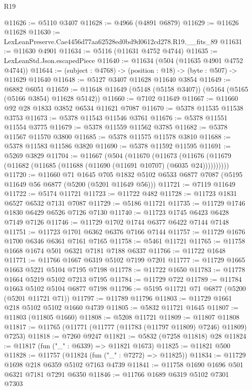\begin{lexlean}{R19}
\begin{coremodule}
{{{{{{{{{{{@11626 := @5110 @3407
@11628 := @4966 (@4891 @6879)
@11629 := @11626 @11628
@11630 := LexLeanPreserve.Cae4456d77aa62528ed0bd9d0612cd278.R19.__fits_89
@11631 := @11630 @4901
@11634 := @5116 (@11631 @4752 @4744)
@11635 := LexLeanStd.Json.escapedPiece
@11640 := @11634 (@504 (@11635 @4901 @4752 @4744))
@11644 := (subject : @4768) -> (position : @18) -> (byte : @507) -> @11629 @11640
@11648 := @5127 @3407 @11628 @11640 @3854
@11649 := @6882 @6051
@11659 := @11648 @11649 (@5148 (@5158 @3407)) (@5164 (@5165 (@5166 @3854) @11628 @5142))
@11660 := @7102 @11649
@11667 := @11660 @92 @28 @1833 @3852 @6534 @11621 @7087
@11670 := @5378 @11535 @11538 @3753
@11673 := @5378 @11543 @11546 @3761
@11676 := @5378 @11551 @11554 @3775
@11679 := @5378 @11559 @11562 @3785
@11682 := @5378 @11567 @11570 @3800
@11685 := @5378 @11575 @11578 @3810
@11688 := @5378 @11583 @11586 @3820
@11690 := @5378 @11592 @11595
@11691 := @5269 @3829
@11704 := @11667
    (@504
      (@11670
        (@11673 (@11676 (@11679 (@11682 (@11685 (@11688 (@11690 (@11691 @10707) (@6035 @24))))))))))
@11720 := @11660
    @71
    @1645
    @705
    @1832
    @5102
    @6533
    @6877
    @7087
    (@5195 @11649 @56 @6877 (@5200 (@5201 @11649 @56)))
@11721 := @7119 @11649
@11722 := @5174 @11721
@11723 := @11722 @482
@11728 := @11723 @1831 @6527 @6532 @7131 @7087
@11729 := @5186 @11721
@11735 := @11729 @1746 @1830 @6429 @6526 @7126 @7130
@11740 := @11723 @1745 @6423 @6428 @7149 @7126
@11746 := @11729 @1702 @1744 @6377 @6422 @7144 @7148
@11751 := @11723 @1701 @6362 @6376 @7166 @7144
@11757 := @11729 @1676 @1700 @6346 @6361 @7161 @7165
@11758 := @5461 @11721
@11765 := @11758 @1668 @1674 @501 @6321 @7181 @7188 @6337
@11766 := @11722 @1648
@11771 := @11766 @1667 @6319 @5102 @7199 @7201
@11777 := @11729 @1665 @1663 @5221 @5104 @7195 @7198
@11778 := @11722 @1650
@11783 := @11778 @1664 @5219 @5102 @7213 @7195
@11784 := @11729 @722
@11789 := @11784 @1663 @5102 @5104 @6877 @7198
@11796 := @5195 @11721 @71 @6877 (@5200 (@5201 @11721 @71))
@11797 := @11789 @11796
@11803 := @11729 @1661 @218 @5102 @5102 @1660 @4739
@11805 := @5832 @11721 @1645
@11807 := @11803 (@11805 @1660)
@11808 := @5208 @11721
@11809 := @11807 @11808
@11817 := @11765 (@11771 (@11777 (@11783 (@11797 @11809) @7246) @11809) @7253)
@11818 := @7260 @9247
@11821 := @5832 (@7258 @11818) @28
@11824 := @11817 (fun ("_" : @6339) => @11821 @1673)
@11825 := @11821 @500
@11828 := @11757 (@11824 (fun ("_" : @7272) => @11825))
@11834 := @11729 @1698 @218 @6359 @5102 @7163 @4739
@11841 := @11758 @1690 @1696 @501 @6321 @7181 @7291 @6350
@11846 := @11766 @1689 @6319 @5102 @7301 @7303
}}}}}}}}}}}
\end{coremodule}
\end{lexlean}
